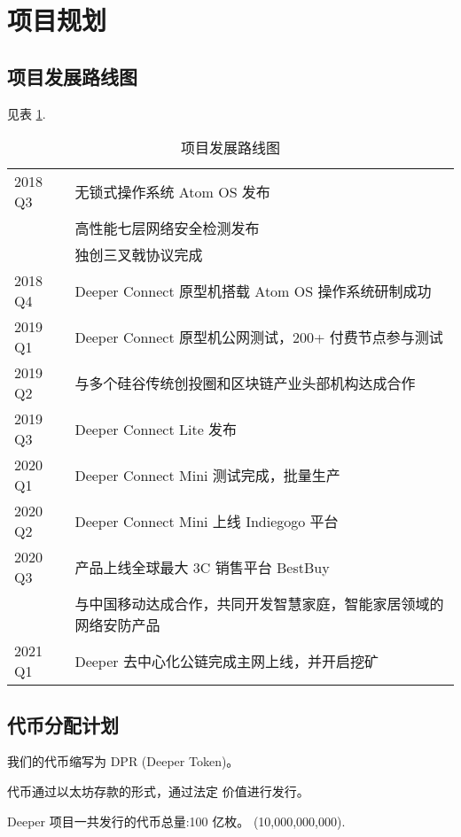 \documentclass[a4paper]{article}
\begin{document}



\newpage
\section{项目规划}

\subsection{项目发展路线图}
见表 \ref{tab:roadmap}.

\begin{table} [hh]
\centering
\begin{tabular}{|l|p{12cm}|}
\hline
2018 Q3		& 无锁式操作系统 Atom OS 发布 \\
& 高性能七层网络安全检测发布 \\
& 独创三叉戟协议完成	 \\ \hline
2018 Q4		& Deeper Connect 原型机搭载 Atom OS 操作系统研制成功 \\ \hline
2019 Q1		& Deeper Connect 原型机公网测试，200+ 付费节点参与测试 \\ \hline
2019 Q2		& 与多个硅谷传统创投圈和区块链产业头部机构达成合作\\ \hline
2019 Q3		& Deeper Connect Lite 发布\\ \hline
2020 Q1    & Deeper Connect Mini 测试完成，批量生产\\ \hline
2020 Q2		& Deeper Connect Mini 上线 Indiegogo 平台 \\ \hline
2020 Q3		& 产品上线全球最大 3C 销售平台 BestBuy \\
& 与中国移动达成合作，共同开发智慧家庭，智能家居领域的网络安防产品\\ \hline
2021 Q1		& Deeper 去中心化公链完成主网上线，并开启挖矿\\ \hline
\end{tabular}
\caption{项目发展路线图} \label{tab:roadmap}
\end{table}

\subsection{代币分配计划}
我们的代币缩写为 DPR (Deeper Token)。

\noindent 代币通过以太坊存款的形式，通过法定
价值进行发行。

\noindent Deeper 项目一共发行的代币总量:100 亿枚。 (10,000,000,000).
\end{document}
